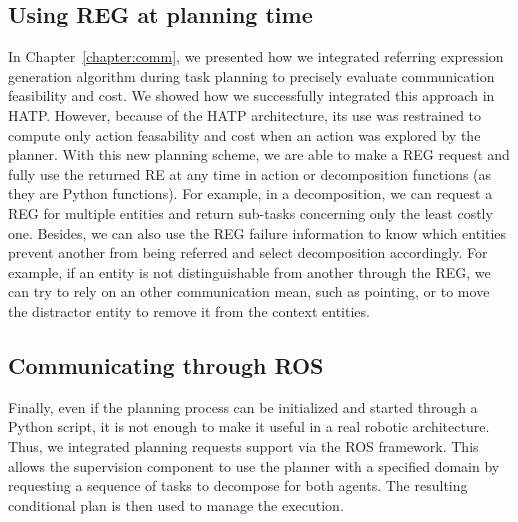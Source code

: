 \documentclass[a4paper,11pt,twoside]{StyleThese}
\begin{document}
\subsection{Using REG at planning time}
In Chapter~\ref{chapter:comm}, we presented how we integrated referring expression generation algorithm during task planning to precisely evaluate communication feasibility and cost. We showed how we successfully integrated this approach in HATP. However, because of the HATP architecture, its use was restrained to compute only action feasability and cost when an action was explored by the planner.
With this new planning scheme, we are able to make a REG request and fully use the returned RE at any time in action or decomposition functions (as they are Python functions). For example, in a decomposition, we can request a REG for multiple entities and return sub-tasks concerning only the least costly one. 
Besides, we can also use the REG failure information to know which entities prevent another from being referred and select decomposition accordingly. For example, if an entity is not distinguishable from another through the REG, we can try to rely on an other communication mean, such as pointing, or to move the distractor entity to remove it from the context entities.

\subsection{Communicating through ROS}
Finally, even if the planning process can be initialized and started through a Python script, it is not enough to make it useful in a real robotic architecture. Thus, we integrated planning requests support via the ROS framework. This allows the supervision component to use the planner with a specified domain by requesting a sequence of tasks to decompose for both agents. The resulting conditional plan is then used to manage the execution.
\end{document}
